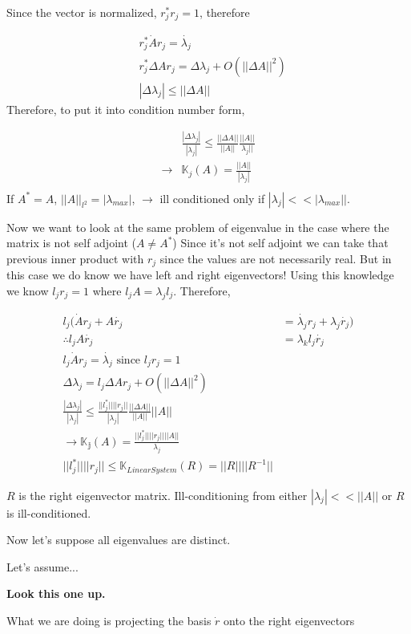 \documentclass{article}
\newcommand{\n}{\newline}
\begin{document}
	Since the vector is normalized, $r_{j}^{*}r_{j}=1$, therefore 
	
	\begin{align*}
		&r_{j}^{*}\dot{A}r_{j}=\dot{\lambda_{j}}\\
		&r_{j}^{*}\Delta Ar_{j}=\Delta \lambda_{j}+O(||\Delta A||^{2})\\
		&|\Delta\lambda_{j}|\leq||\Delta A||
	\end{align*}
	Therefore, to put it into condition number form,
	
	\begin{align*}
		&\frac{|\Delta\lambda_{j}|}{|\lambda_{j}|}\leq\frac{||\Delta A||}{||A||}\frac{||A||}{\lambda_{j}||}\\
		\rightarrow&\mathbb{K}_{j}(A)=\frac{||A||}{|\lambda_{j}|}\\
	\end{align*}
	If $A^{*}=A$, $||A||_{l^2}=|\lambda_{max}|$, $\rightarrow$ ill conditioned only if $|\lambda_{j}|<<|\lambda_{max}||$.  \n
	
	Now we want to look at the same problem of eigenvalue in the case where the matrix is not self adjoint ($A\neq A^{*}$)  Since it's not self adjoint we can take that previous inner product with $r_{j}$ since the values are not necessarily real.  But in this case we do know we have left and right eigenvectors!  Using this knowledge we know $l_{j}r_{j}=1$ where $l_{j}A=\lambda_{j}l_{j}$.  Therefore,
	
	\begin{align*}
		l_{j}(\dot{A}r_{j}+A\dot{r_{j}}&=\dot{\lambda_{j}}r_{j}+\lambda_{j}\dot{r_{j}})\\
		\therefore l_{j}A\dot{r_{j}}&=\lambda_{k}l_{j}\dot{r_{j}}\\
		l_{j}\dot{A}r_{j}=\dot{\lambda_{j}} \text{ since }l_{j}r_{j}=1\\
		\Delta\lambda_{j}=l_{j}\Delta A r_{j}+O(||\Delta A||^{2})\\
		\frac{|\Delta\lambda_{j}|}{|\lambda_{j}|}\leq\frac{||l_{j}^{*}||||r_{j}||}{|\lambda_{j}|}\frac{||\Delta A||}{||A||}||A||\\
		\rightarrow \mathbb{K_{j}}(A)=\frac{||l_{j}^{*}||||r_{j}||||A||}{\lambda_{j}}\\
		||l_{j}^{*}||||r_{j}||\leq \mathbb{K}_{LinearSystem}(R)=||R||||R^{-1}||
	\end{align*}
	
	$R$ is the right eigenvector matrix.  Ill-conditioning from either $|\lambda_{j}|<<||A||$ or $R$ is ill-conditioned. \n
	
	Now let's suppose all eigenvalues are distinct.  \n
	
	Let's assume...
	
	\textbf{Look this one up.}
	
	What we are doing is projecting the basis $\dot{r}$ onto the right eigenvectors
	
\end{document}
